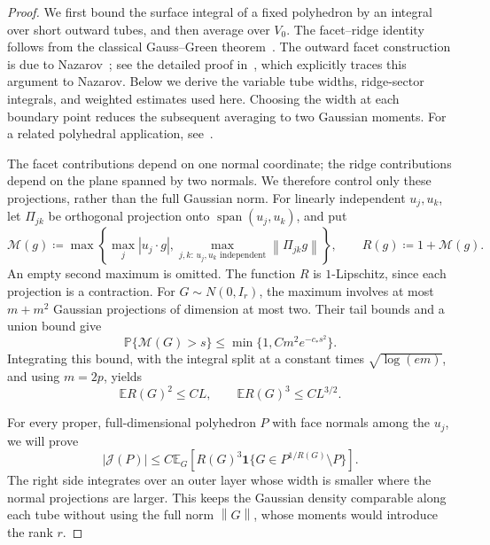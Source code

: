 \documentclass[11pt,letterpaper]{article}
\theoremstyle{remark}
\newcommand{\E}{\mathbb E}
\newcommand{\Pp}{\mathbb P}
\newcommand{\norm}[1]{\left\lVert#1\right\rVert}
\newcommand{\ind}{\mathbf 1}
\newcommand{\surf}{\mathcal J}
\begin{document}
\begin{proof}
We first bound the surface integral of a fixed polyhedron by an integral
over short outward tubes, and then average over \(V_0\). The
facet--ridge identity follows from the classical Gauss--Green
theorem~\cite[Chapter~5]{EvansGariepy2015}. The outward facet construction
is due to Nazarov~\cite{Nazarov2003}; see the detailed proof
in~\cite[Lemmas~1--2]{CCK17N}, which explicitly traces this argument
to Nazarov. Below we derive the variable tube widths, ridge-sector
integrals, and weighted estimates used here. Choosing the width at each
boundary point reduces the subsequent averaging to two Gaussian moments.
For a related polyhedral application, see~\cite[Proposition~4]{GaoZhang}.

The facet contributions depend on one normal coordinate; the ridge
contributions depend on the plane spanned by two normals. We therefore
control only these projections, rather than the full Gaussian norm. For linearly independent \(u_j,u_k\), let \(\Pi_{jk}\)
be orthogonal projection onto \(\operatorname{span}(u_j,u_k)\), and put
\begin{equation}
 \mathcal M(g)\coloneqq \max\left\{\max_j|u_j\cdot g|,
       \max_{j,k:\,u_j,u_k\text{ independent}}\norm{\Pi_{jk}g}\right\},
 \qquad R(g)\coloneqq 1+\mathcal M(g).
 \label{appx-an:projection-radius}
\end{equation}
An empty second maximum is omitted. The function \(R\) is
\(1\)-Lipschitz, since each projection is a contraction. For
\(G\sim N(0,I_r)\), the maximum involves at most \(m+m^2\)
Gaussian projections of dimension at most two. Their tail bounds and
a union bound give
\[
 \Pp\{\mathcal M(G)>s\}\le\min\{1,Cm^2e^{-c_*s^2}\}.
\]
Integrating this bound, with the integral split at a constant times
\(\sqrt{\log(em)}\), and using \(m=2p\), yields
\begin{equation}
 \E R(G)^2\le CL,\qquad \E R(G)^3\le CL^{3/2}.
 \label{appx-an:projection-moments}
\end{equation}

For every proper, full-dimensional polyhedron \(P\) with face normals among
the \(u_j\), we will prove
\begin{equation}
 |\surf(P)|\le C\E_G\left[R(G)^3
       \ind\{G\in P^{1/R(G)}\setminus P\}\right].
 \label{appx-an:adaptive-tubes}
\end{equation}
The right side integrates over an outer layer whose width is smaller
where the normal projections are larger. This keeps the Gaussian
density comparable along each tube without using the full norm
\(\norm G\), whose moments would introduce the rank \(r\).


\end{proof}
\end{document}
